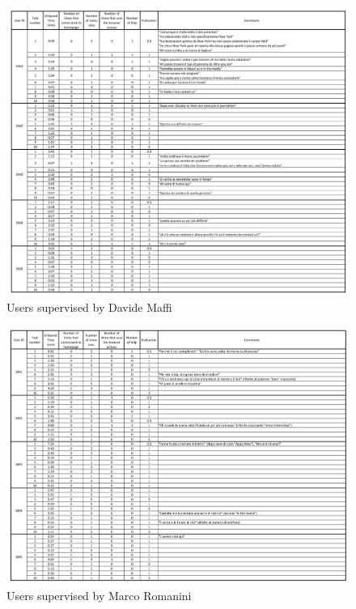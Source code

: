\documentclass[11pt, letterpaper]{article}
\begin{document}
    \begin{figure}[H]
        \centering
        \includegraphics[width=18cm]{images/annex/DM_usertesting.png}
        \caption{Users supervised by Davide Maffi}
    \end{figure}
    \begin{figure}[H]
        \centering
        \includegraphics[width=18cm]{images/annex/MR_usertesting.png}
        \caption{Users supervised by Marco Romanini}
    \end{figure}
\end{document}
